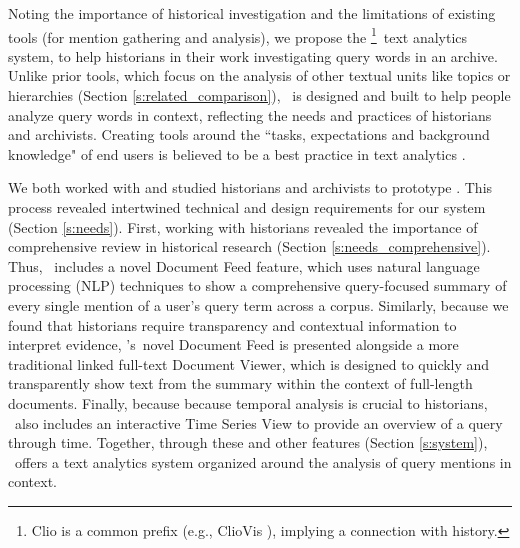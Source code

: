 

Noting the importance of historical investigation and the limitations of existing tools (for mention gathering and analysis), we propose the \ours\footnote{Clio is a common prefix (e.g., ClioVis \cite{ClioVis}), implying a connection with history.}~text analytics system, to help historians in their work investigating query words in an archive.
Unlike prior tools, which focus on the analysis of other textual units like topics or hierarchies (Section \ref{s:related_comparison}), \ours~is designed and built to help people analyze query words in context, reflecting the needs and practices of historians and archivists.
Creating tools around the ``tasks, expectations and background knowledge" of end users is believed to be a best practice in text analytics \cite{chuangheer}.

We both worked with and studied historians and archivists to prototype \ours.
This process revealed intertwined technical and design requirements for our system (Section \ref{s:needs}).
First, working with historians revealed the importance of comprehensive review in historical research (Section \ref{s:needs_comprehensive}). 
Thus, \ours~includes a novel Document Feed feature, which uses natural language processing (NLP) techniques to show a comprehensive query-focused summary of every single mention of a user's query term across a corpus.
Similarly, because we found that historians require transparency and contextual information to interpret evidence, \ours's~novel Document Feed is presented alongside a more traditional linked full-text Document Viewer, which is designed to quickly and transparently show text from the summary within the context of full-length documents.
Finally, because because temporal analysis is crucial to historians, \ours~also includes an interactive Time Series View to provide an overview of a query through time.
Together, through these and other features (Section \ref{s:system}), \ours~offers a text analytics system organized around the analysis of query mentions in context. 

